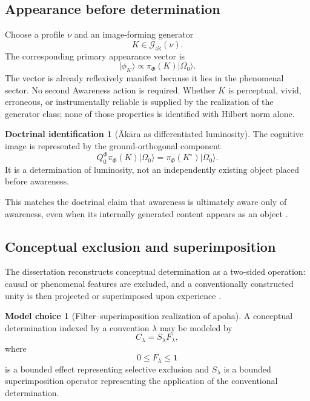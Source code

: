 \documentclass[11pt,reqno]{scrartcl}
\newcommand{\piF}{\pi_{\Phi}}
\newcommand{\QzeroF}{Q_{0}^{\Phi}}
\newcommand{\idop}{\mathbf 1}
\newcommand{\ket}[1]{\lvert #1\rangle}
\newcommand{\vas}{\nu}
\newcommand{\Gak}{\mathcal G_{\mathrm{ak}}}
\theoremstyle{plain}
\theoremstyle{definition}
\newtheorem{identification}[identification]{Doctrinal identification}
\newtheorem{modelchoice}[modelchoice]{Model choice}
\theoremstyle{remark}
\begin{document}
\subsection{Appearance before determination}

Choose a profile $\vas$ and an image-forming generator
\begin{equation}
  K\in\Gak(\vas).
\end{equation}
The corresponding primary appearance vector is
\begin{equation}
  \ket{\phi_K}
  \propto\piF(K)\ket{\Omega_0}.
  \label{eq:primary-akara-state}
\end{equation}
The vector is already reflexively manifest because it lies in the phenomenal
sector.  No second Awareness action is required.  Whether $K$ is perceptual,
vivid, erroneous, or instrumentally reliable is supplied by the realization
of the generator class; none of those properties is identified with Hilbert
norm alone.

\begin{identification}[\=Ak\=ara as differentiated luminosity]
\label{id:akara-differentiated-luminosity}
The cognitive image is represented by the ground-orthogonal component
\begin{equation}
  \QzeroF\piF(K)\ket{\Omega_0}
  =\piF(K^{\circ})\ket{\Omega_0}.
  \label{eq:akara-centered-component}
\end{equation}
It is a determination of luminosity, not an independently existing object
placed before awareness.
\end{identification}

This matches the doctrinal claim that awareness is ultimately aware only of
awareness, even when its internally generated content appears as an object
\cite[pp.~31--32]{Yiannopoulos2020}.

\subsection{Conceptual exclusion and superimposition}

The dissertation reconstructs conceptual determination as a two-sided
operation: causal or phenomenal features are excluded, and a conventionally
constructed unity is then projected or superimposed upon experience
\cite[pp.~64--70, 90--94]{Yiannopoulos2020}.

\begin{modelchoice}[Filter--superimposition realization of apoha]
\label{choice:apoha-filter-superimposition}
A conceptual determination indexed by a convention $\lambda$ may be modeled
by
\begin{equation}
  C_{\lambda}=S_{\lambda}F_{\lambda},
  \label{eq:apoha-two-stage-operator}
\end{equation}
where
\begin{equation}
  0\leq F_{\lambda}\leq\idop
  \label{eq:apoha-filter-effect}
\end{equation}
is a bounded effect representing selective exclusion and
$S_{\lambda}$ is a bounded superimposition operator representing the
application of the conventional determination.
\end{modelchoice}
\end{document}

